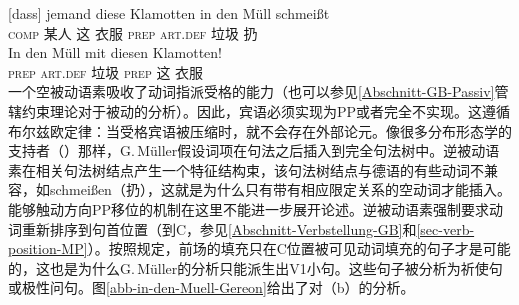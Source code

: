 \begin{exe}
\begin{xlist}[iv.]
\begin{exe}
\begin{xlist}[iv.]
\eal
\ex 
\gll {}[dass] jemand diese Klamotten in den Müll schmeißt\\
     {}\spacebr{}\textsc{comp} 某人 这 衣服 \textsc{prep} \textsc{art}.\textsc{def} 垃圾 扔\\
\ex\label{in-den-Muell-mit} 
\gll In den Müll mit diesen Klamotten!\\
     \textsc{prep} \textsc{art}.\textsc{def} 垃圾 \textsc{prep} 这 衣服\\
\zl
一个空被动语素吸收了动词指派受格的能力（也可以参见\ref{Abschnitt-GB-Passiv}管辖约束理论对于被动的分析）。因此，宾语必须实现为PP或者完全不实现。这遵循布尔兹欧定律：当受格宾语被压缩时，就不会存在外部论元。像很多分布形态学的支持者（\egc \citet{Marantz97a}）那样，G.\,Müller假设词项在句法之后插入到完全句法树中。逆被动语素在相关句法树结点产生一个特征结构束，该句法树结点与德语的有些动词不兼容，如schmeißen（扔），这就是为什么只有带有相应限定关系的空动词才能插入。能够触动方向PP移位的机制在这里不能进一步展开论述。逆被动语素强制要求动词重新排序到句首位置（到C，参见\ref{Abschnitt-Verbstellung-GB}和\ref{sec-verb-position-MP}）。按照规定，前场的填充只在C位置被可见动词填充的句子才是可能的，这也是为什么G.\,Müller的分析只能派生出V1小句。这些句子被分析为祈使句或极性问句。图\vref{abb-in-den-Muell-Gereon}给出了对（b）的分析。

\end{xlist}
\end{exe}
\end{xlist}
\end{exe}
